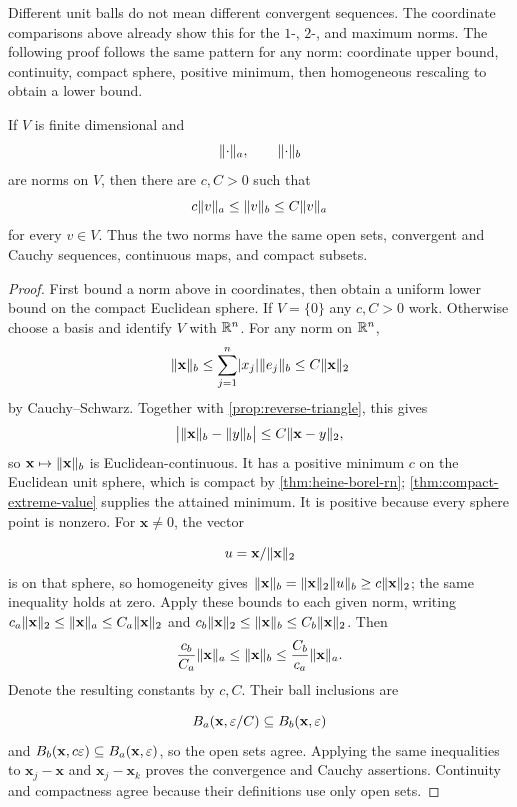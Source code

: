 \begin{center}
\end{center}
Different unit balls do not mean different convergent sequences. The
coordinate comparisons above already show this for the $1$-, $2$-, and
maximum norms.
The following proof follows the same pattern for any norm:
coordinate upper bound, continuity, compact sphere, positive minimum,
then homogeneous rescaling to obtain a lower bound.
\begin{theorem}
\label{thm:equivalent-norms}
If $V$ is finite dimensional and
\[
\lVert \cdot\rVert_a,\qquad\lVert \cdot\rVert_b
\]
are norms on $V$, then there are $c,C>0$ such that
\[
c\lVert v\rVert_a\leq\lVert v\rVert_b\leq C\lVert v\rVert_a
\]
for every $v\in V$.  Thus the two norms have the same open sets, convergent
and Cauchy sequences, continuous maps, and compact subsets.
\end{theorem}
\begin{proof}
First bound a norm above in coordinates, then obtain a
uniform lower bound on the compact Euclidean sphere. If $V=\{0\}$ any
$c,C>0$ work. Otherwise choose a basis and identify $V$ with $\mathbb{R}^n$.
For any norm on $\mathbb{R}^n$,
\[
\lVert \mathbf{x}\rVert_b\leq\sum_{j=1}^{n}\lvert x_j\rvert\lVert e_j\rVert_b
\leq C\lVert \mathbf{x}\rVert_2
\]
by Cauchy--Schwarz.  Together with \cref{prop:reverse-triangle}, this gives
\[
\bigl\lvert\lVert \mathbf{x}\rVert_b-\lVert y\rVert_b\bigr\rvert
\leq C\lVert \mathbf{x}-y\rVert_2,
\]
so $\mathbf{x}\mapsto\lVert \mathbf{x}\rVert_b$ is Euclidean-continuous.  It has a positive minimum
$c$ on the Euclidean
unit sphere, which is compact by \cref{thm:heine-borel-rn};
\cref{thm:compact-extreme-value} supplies the attained minimum. It is
positive because every sphere point is nonzero. For $\mathbf{x}\ne0$, the vector

\[
u=\mathbf{x}/\lVert \mathbf{x}\rVert_2
\]
 is on that sphere, so homogeneity gives
$\lVert \mathbf{x}\rVert_b=\lVert \mathbf{x}\rVert_2\lVert u\rVert_b\geq c\lVert \mathbf{x}\rVert_2$; the same inequality
holds at zero. Apply these bounds to each given norm, writing
$c_a\lVert \mathbf{x}\rVert_2\leq\lVert \mathbf{x}\rVert_a\leq C_a\lVert \mathbf{x}\rVert_2$ and
$c_b\lVert \mathbf{x}\rVert_2\leq\lVert \mathbf{x}\rVert_b\leq C_b\lVert \mathbf{x}\rVert_2$. Then
\[
\frac{c_b}{C_a}\lVert \mathbf{x}\rVert_a\leq\lVert \mathbf{x}\rVert_b
\leq\frac{C_b}{c_a}\lVert \mathbf{x}\rVert_a.
\]
Denote the resulting constants by $c,C$. Their ball inclusions are

\[
B_a(\mathbf{x},\varepsilon/C)\subseteq B_b(\mathbf{x},\varepsilon)
\]
 and
$B_b(\mathbf{x},c\varepsilon)\subseteq B_a(\mathbf{x},\varepsilon)$, so the open sets agree.
Applying the same inequalities to $\mathbf{x}_j-\mathbf{x}$ and $\mathbf{x}_j-\mathbf{x}_k$ proves the
convergence and Cauchy assertions. Continuity and compactness agree
because their definitions use only open sets.
\end{proof}
